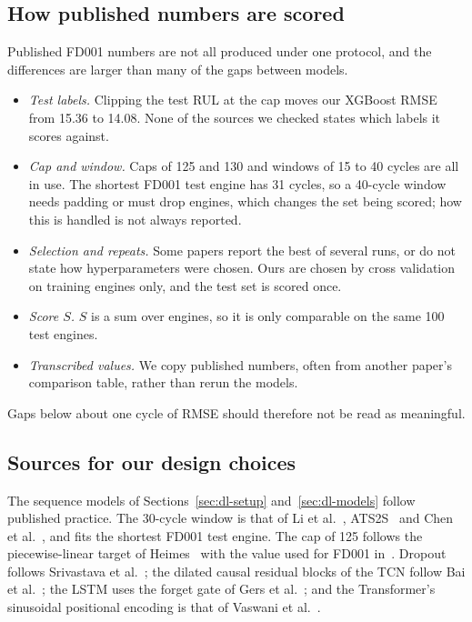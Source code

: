 \subsection{How published numbers are scored}
Published FD001 numbers are not all produced under one protocol, and the
differences are larger than many of the gaps between models.
\begin{itemize}
\item \emph{Test labels.} Clipping the test RUL at the cap moves our
XGBoost RMSE from 15.36 to 14.08. None of the sources we checked states
which labels it scores against.
\item \emph{Cap and window.} Caps of 125 and 130 and windows of 15 to 40
cycles are all in use. The shortest FD001 test engine has 31 cycles, so a
40-cycle window needs padding or must drop engines, which changes the set
being scored; how this is handled is not always reported.
\item \emph{Selection and repeats.} Some papers report the best of several
runs, or do not state how hyperparameters were chosen. Ours are chosen by
cross validation on training engines only, and the test set is scored once.
\item \emph{Score $S$.} $S$ is a sum over engines, so it is only comparable
on the same 100 test engines.
\item \emph{Transcribed values.} We copy published numbers, often from
another paper's comparison table, rather than rerun the models.
\end{itemize}
Gaps below about one cycle of RMSE should therefore not be read as
meaningful.

\subsection{Sources for our design choices}
The sequence models of Sections~\ref{sec:dl-setup} and~\ref{sec:dl-models}
follow published practice. The 30-cycle window is that of Li et
al.~\cite{li2018dcnn}, ATS2S~\cite{ragab2020attention} and Chen et
al.~\cite{chen2021attention}, and fits the shortest FD001 test engine. The
cap of 125 follows the piecewise-linear target of
Heimes~\cite{heimes2008rnn} with the value used for FD001
in~\cite{li2018dcnn,ragab2020attention,zhang2022dast}. Dropout follows
Srivastava et al.~\cite{srivastava2014dropout}; the dilated causal residual
blocks of the TCN follow Bai et al.~\cite{bai2018tcn}; the LSTM uses the
forget gate of Gers et al.~\cite{gers2000forget}; and the Transformer's
sinusoidal positional encoding is that of Vaswani et
al.~\cite{vaswani2017attention}.
